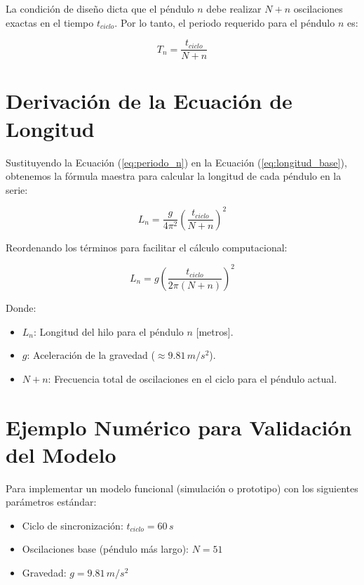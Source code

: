 \documentclass[12pt, a4paper]{article}
\begin{document}
	La condición de diseño dicta que el péndulo $n$ debe realizar $N + n$ oscilaciones exactas en el tiempo $t_{ciclo}$. Por lo tanto, el periodo requerido para el péndulo $n$ es:
	
	\begin{equation}
		T_n = \frac{t_{ciclo}}{N + n}
		\label{eq:periodo_n}
	\end{equation}
	
	\section{Derivación de la Ecuación de Longitud}
	Sustituyendo la Ecuación (\ref{eq:periodo_n}) en la Ecuación (\ref{eq:longitud_base}), obtenemos la fórmula maestra para calcular la longitud de cada péndulo en la serie:
	
	\begin{equation}
		L_n = \frac{g}{4\pi^2} \left( \frac{t_{ciclo}}{N + n} \right)^2
	\end{equation}
	
	Reordenando los términos para facilitar el cálculo computacional:
	
	\begin{equation} \label{eq:formula_final}
		\boxed{L_n = g \left( \frac{t_{ciclo}}{2\pi (N + n)} \right)^2}
	\end{equation}
	
	Donde:
	\begin{itemize}
		\item $L_n$: Longitud del hilo para el péndulo $n$ [metros].
		\item $g$: Aceleración de la gravedad ($\approx 9.81 \, m/s^2$).
		\item $N + n$: Frecuencia total de oscilaciones en el ciclo para el péndulo actual.
	\end{itemize}
	
	\section{Ejemplo Numérico para Validación del Modelo}
	Para implementar un modelo funcional (simulación o prototipo) con los siguientes parámetros estándar:
	\begin{itemize}
		\item Ciclo de sincronización: $t_{ciclo} = 60 \, s$
		\item Oscilaciones base (péndulo más largo): $N = 51$
		\item Gravedad: $g = 9.81 \, m/s^2$
	\end{itemize}
	
\end{document}
